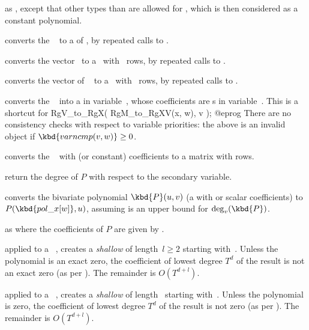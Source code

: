  as , except that other
types than  are allowed for , which is then considered as a
constant polynomial.

 converts the ~ to a
 of , by repeated calls to .

 converts the vector~ to
a~ with ~rows, by repeated calls to .

 converts the vector of ~
to a~ with ~rows, by repeated calls to .

 converts the ~ into
a  in variable~, whose coefficients are s in
variable~. This is a shortcut for
\bprog
  RgV_to_RgX( RgM_to_RgXV(x, w), v );
@eprog\noindent
There are no consistency checks with respect to variable
priorities: the above is an invalid object if $\kbd{varncmp(v, w)} \geq 0$.

 converts the ~ with
 (or constant) coefficients to a matrix with  rows.

 return the degree of $P$ with respect to
the secondary variable.

 converts the bivariate polynomial
$\kbd{P}(u,v)$ (a  with  or scalar coefficients) to
$P(\kbd{pol\_x[w]},u)$, assuming  is an upper bound for
$\deg_v(\kbd{P})$.

as  where the coefficients of $P$ are given by
.

 applied to a ~, creates
a \emph{shallow}  of length~$l\geq 2$ starting with~.
Unless the polynomial is an exact zero, the coefficient of lowest degree
$T^d$ of the result is not an exact zero (as per ). The
remainder is $O(T^{d+l})$.

 applied to a ~,
creates a \emph{shallow}  of length~ starting with~.
Unless the polynomial is zero, the coefficient of lowest degree
$T^d$ of the result is not zero (as per ). The
remainder is $O(T^{d+l})$.

